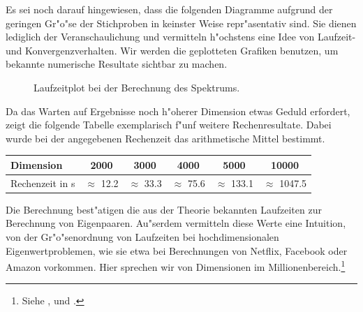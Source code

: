 \newpage

Es sei noch darauf hingewiesen, dass die folgenden Diagramme aufgrund der geringen Gr"o"se der Stichproben in keinster Weise repr"asentativ sind. Sie dienen lediglich der Veranschaulichung und vermitteln h"ochstens eine Idee von Laufzeit- und Konvergenzverhalten. Wir werden die geplotteten Grafiken benutzen, um bekannte numerische Resultate sichtbar zu machen.

\begin{figure}[h!]
\centering


\caption{Laufzeitplot bei der Berechnung des Spektrums.}\label{fig:chap5:laufzeit}
\end{figure}

Da das Warten auf Ergebnisse noch h"oherer Dimension etwas Geduld erfordert, zeigt die folgende Tabelle exemplarisch f"unf weitere Rechenresultate. Dabei wurde bei der angegebenen Rechenzeit das arithmetische Mittel bestimmt.

\begin{center}
\begin{tabular}{lccccc}
Dimension & 2000 & 3000 & 4000 & 5000 & 10000 \\
\hline
Rechenzeit in s & $\approx$ 12.2 & $\approx$ 33.3 & $\approx$ 75.6 & $\approx$ 133.1 & $\approx$ 1047.5
\end{tabular}
\end{center}

Die Berechnung best"atigen die aus der Theorie bekannten Laufzeiten zur Berechnung von Eigenpaaren.
Au"serdem vermitteln diese Werte eine Intuition, von der Gr"o"senordnung von Laufzeiten bei hochdimensionalen Eigenwertproblemen, wie sie etwa bei Berechnungen von Netflix, Facebook oder Amazon vorkommen. Hier sprechen wir von Dimensionen im Millionenbereich.\footnote{Siehe \cite{facebook}, \cite{amazon} und \cite{netflix}.}\\

